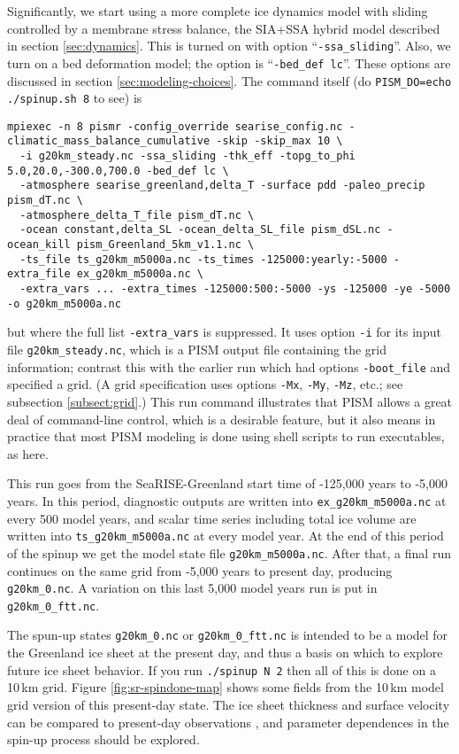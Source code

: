 Significantly, we start using a more complete ice dynamics model with sliding controlled by a membrane stress balance, the SIA+SSA hybrid model described in section \ref{sec:dynamics}.  This is turned on with option ``\texttt{-ssa_sliding}''.  Also, we turn on a bed deformation model; the option is ``\texttt{-bed_def lc}''.  These options are discussed in section \ref{sec:modeling-choices}.  The command itself (do \verb|PISM_DO=echo ./spinup.sh 8| to see) is
\small
\begin{verbatim}
mpiexec -n 8 pismr -config_override searise_config.nc -climatic_mass_balance_cumulative -skip -skip_max 10 \
  -i g20km_steady.nc -ssa_sliding -thk_eff -topg_to_phi 5.0,20.0,-300.0,700.0 -bed_def lc \
  -atmosphere searise_greenland,delta_T -surface pdd -paleo_precip pism_dT.nc \
  -atmosphere_delta_T_file pism_dT.nc \
  -ocean constant,delta_SL -ocean_delta_SL_file pism_dSL.nc -ocean_kill pism_Greenland_5km_v1.1.nc \
  -ts_file ts_g20km_m5000a.nc -ts_times -125000:yearly:-5000 -extra_file ex_g20km_m5000a.nc \
  -extra_vars ... -extra_times -125000:500:-5000 -ys -125000 -ye -5000 -o g20km_m5000a.nc
\end{verbatim}
\normalsize
but where the full list \verb|-extra_vars| is suppressed.  It uses option \verb|-i| for its input file \verb|g20km_steady.nc|, which is a PISM output file containing the grid information; contrast this with the earlier run which had options \verb|-boot_file| and specified a grid.   (A grid specification uses options \verb|-Mx|, \verb|-My|, \verb|-Mz|, etc.; see subsection \ref{subsect:grid}.)  This run command illustrates that PISM allows a great deal of command-line control, which is a desirable feature, but it also means in practice that most PISM modeling is done using shell scripts to run executables, as here.

This run goes from the SeaRISE-Greenland start time of -125,000 years to -5,000 years.  In this period, diagnostic outputs are written into \texttt{ex_g20km_m5000a.nc} at every 500 model years, and scalar time series including total ice volume are written into \texttt{ts_g20km_m5000a.nc} at every model year.  At the end of this period of the spinup we get the model state file \texttt{g20km_m5000a.nc}.  After that, a final run continues on the same grid from -5,000 years to present day, producing \texttt{g20km_0.nc}.  A variation on this last 5,000 model years run is put in \texttt{g20km_0_ftt.nc}.



The spun-up states \texttt{g20km_0.nc} or \texttt{g20km_0_ftt.nc} is intended to be a model for the Greenland ice sheet at the present day, and thus a basis on which to explore future ice sheet behavior.  If you run \texttt{./spinup N 2} then all of this is done on a 10\,km grid.  Figure \ref{fig:sr-spindone-map} shows some fields from the 10\,km model grid version of this present-day state.  The ice sheet thickness and surface velocity can be compared to present-day observations \cite{BKAJS}, and parameter dependences in the spin-up process should be explored.

